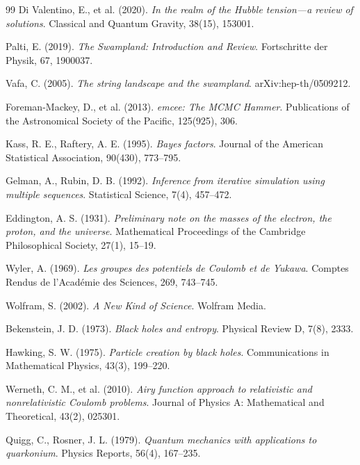 \documentclass[11pt, a4paper]{article}
\theoremstyle{plain}
\theoremstyle{definition}
\begin{document}
\begin{thebibliography}{99}
Di Valentino, E., et al. (2020). \textit{In the realm of the Hubble tension—a review of solutions}. Classical and Quantum Gravity, 38(15), 153001.

Palti, E. (2019). \textit{The Swampland: Introduction and Review}. Fortschritte der Physik, 67, 1900037.

Vafa, C. (2005). \textit{The string landscape and the swampland}. arXiv:hep-th/0509212.

Foreman-Mackey, D., et al. (2013). \textit{emcee: The MCMC Hammer}. Publications of the Astronomical Society of the Pacific, 125(925), 306.

Kass, R. E., Raftery, A. E. (1995). \textit{Bayes factors}. Journal of the American Statistical Association, 90(430), 773–795.

Gelman, A., Rubin, D. B. (1992). \textit{Inference from iterative simulation using multiple sequences}. Statistical Science, 7(4), 457–472.

Eddington, A. S. (1931). \textit{Preliminary note on the masses of the electron, the proton, and the universe}. Mathematical Proceedings of the Cambridge Philosophical Society, 27(1), 15–19.

Wyler, A. (1969). \textit{Les groupes des potentiels de Coulomb et de Yukawa}. Comptes Rendus de l'Académie des Sciences, 269, 743–745.

Wolfram, S. (2002). \textit{A New Kind of Science}. Wolfram Media.

Bekenstein, J. D. (1973). \textit{Black holes and entropy}. Physical Review D, 7(8), 2333.

Hawking, S. W. (1975). \textit{Particle creation by black holes}. Communications in Mathematical Physics, 43(3), 199–220.

Werneth, C. M., et al. (2010). \textit{Airy function approach to relativistic and nonrelativistic Coulomb problems}. Journal of Physics A: Mathematical and Theoretical, 43(2), 025301.

Quigg, C., Rosner, J. L. (1979). \textit{Quantum mechanics with applications to quarkonium}. Physics Reports, 56(4), 167–235.


\end{thebibliography}
\end{document}
